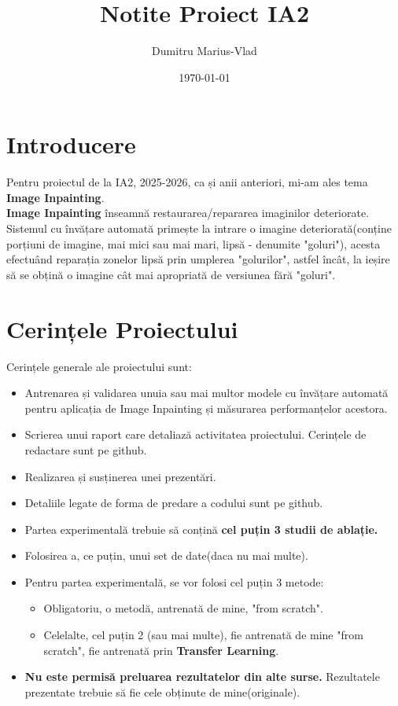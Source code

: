\documentclass[12pt, a4paper]{article}
\title{Notite Proiect IA2}
\author{Dumitru Marius-Vlad}
\date{\today}
\begin{document}
\maketitle
\section{Introducere}
    Pentru proiectul de la IA2, 2025-2026, ca și anii anteriori, mi-am ales tema \textbf{Image Inpainting}.\\
    \textbf{Image Inpainting} înseamnă restaurarea/repararea imaginilor deteriorate. Sistemul cu învățare automată primește la intrare o imagine deteriorată(conține porțiuni de imagine, mai mici sau mai mari, lipsă - denumite "goluri"), acesta efectuând reparația zonelor lipsă prin umplerea "golurilor", astfel încât, la ieșire să se obțină o imagine cât mai apropriată de versiunea fără "goluri".

\section{Cerințele Proiectului}
Cerințele generale ale proiectului sunt:
\begin{itemize}
    \item Antrenarea și validarea unuia sau mai multor modele cu învățare automată pentru aplicația de Image Inpainting și măsurarea performanțelor acestora.
    \item Scrierea unui raport care detaliază activitatea proiectului. Cerințele de redactare sunt pe github.
    \item Realizarea și susținerea unei prezentări.
    \item Detaliile legate de forma de predare a codului sunt pe github.
    \item Partea experimentală trebuie să conțină \textbf{cel puțin 3 studii de ablație.}
    \item Folosirea a, ce puțin, unui set de date(daca nu mai multe).
    \item Pentru partea experimentală, se vor folosi cel puțin 3 metode:
        \begin{itemize}
            \item Obligatoriu, o metodă, antrenată de mine, "from scratch".
            \item Celelalte, cel puțin 2 (sau mai multe), fie antrenată de mine "from scratch", fie antrenată prin \textbf{Transfer Learning}.
        \end{itemize}
    \item \textbf{\color{red} Nu este permisă preluarea rezultatelor din alte surse.} Rezultatele prezentate trebuie să fie cele obținute de mine(originale).
\end{itemize}
\end{document}
